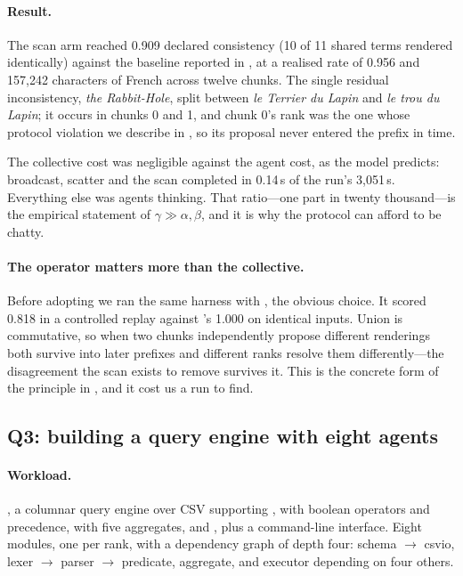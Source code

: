 \paragraph{Result.} The scan arm reached 0.909 declared consistency
(10 of 11 shared terms rendered identically) against the baseline reported
in , at a realised rate of 0.956 and 157{,}242
characters of French across twelve chunks. The single residual
inconsistency, \emph{the Rabbit-Hole}, split between
\emph{le Terrier du Lapin} and \emph{le trou du Lapin}; it occurs in chunks
0 and 1, and chunk 0's rank was the one whose protocol violation we describe
in , so its proposal never entered the
prefix in time.

The collective cost was negligible against the agent cost, as the model
predicts: broadcast, scatter and the scan completed in 0.14\,s of the run's
3{,}051\,s. Everything else was agents thinking. That ratio---one part in
twenty thousand---is the empirical statement of $\gamma \gg \alpha, \beta$,
and it is why the protocol can afford to be chatty.

\paragraph{The operator matters more than the collective.} Before adopting
 we ran the same harness with , the obvious choice. It
scored 0.818 in a controlled replay against 's 1.000 on identical
inputs. Union is commutative, so when two chunks independently propose
different renderings both survive into later prefixes and different ranks
resolve them differently---the disagreement the scan exists to remove
survives it. This is the concrete form of the principle in
, and it cost us a run to find.

\subsection{Q3: building a query engine with eight agents}
\label{sec:eval-software}

\paragraph{Workload.} , a columnar query engine over CSV
supporting ,  with boolean operators and
precedence,  with five aggregates,  and
, plus a command-line interface. Eight modules, one per rank,
with a dependency graph of depth four: schema $\to$ csvio, lexer $\to$
parser $\to$ predicate, aggregate, and executor depending on four others.

